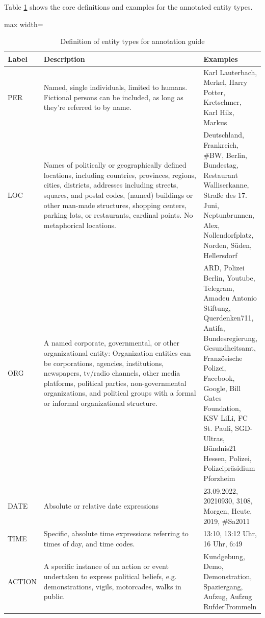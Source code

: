 Table \ref{tab:entity_types} shows the core definitions and examples for the annotated entity types. 

\begin{table}[]
\caption{Definition of entity types for annotation guide}
\label{tab:entity_types}
\centering
\begin{adjustbox}{max width=\textwidth}
\begin{tabular}{|p{0.12\linewidth}|p{0.7\linewidth}|p{0.4\linewidth}|}
\hline
\textbf{Label} & \textbf{Description} & \textbf{Examples} \\
\hline 

PER 
& Named, single individuals, limited to humans. Fictional persons can be included, as long as they’re referred to by name. 
& Karl Lauterbach, Merkel, Harry Potter, Kretschmer, Karl Hilz, Markus
\\
\hline
LOC 
& Names of politically or geographically defined locations, including countries, provinces, regions, cities, districts, addresses including streets, squares, and postal codes, (named) buildings or other man-made structures, shopping centers, parking lots, or restaurants, cardinal points. No metaphorical locations.
& Deutschland, Frankreich, \#BW, Berlin, Bundestag, Restaurant Walliserkanne, Straße des 17. Juni, Neptunbrunnen, Alex, Nollendorfplatz, Norden, Süden, Hellersdorf
 \\ 
\hline
ORG 
& A named corporate, governmental, or other organizational entity: Organization entities can be corporations, agencies, institutions, newspapers, tv/radio channels, other media platforms, political parties, non-governmental organizations, and political groups with a formal or informal organizational structure.
 & ARD, Polizei Berlin, Youtube, Telegram, Amadeu Antonio Stiftung, Querdenken711, Antifa, Bundesregierung, Gesundheitsamt, Französische Polizei, Facebook, Google, Bill Gates Foundation, KSV LiLi, FC St. Pauli, SGD-Ultras, Bündnis21 Hessen, Polizei, Polizeipräsidium Pforzheim
 \\ 
\hline
DATE 
& Absolute or relative date expressions 
& 23.09.2022, 20210930, 3108, Morgen, Heute, 2019, \#Sa2011 \\ 
\hline
TIME 
& Specific, absolute time expressions referring to times of day, and time codes. 
& 13:10, 13:12 Uhr, 16 Uhr, 6:49 \\ 
\hline
ACTION 
& A specific instance of an action or event undertaken to express political beliefs, e.g. demonstrations, vigils, motorcades, walks in public.  
& Kundgebung, Demo, Demonstration, Spaziergang, Aufzug, Aufzug RufderTrommeln \\ 
\hline
\end{tabular}
\end{adjustbox}
\end{table}

